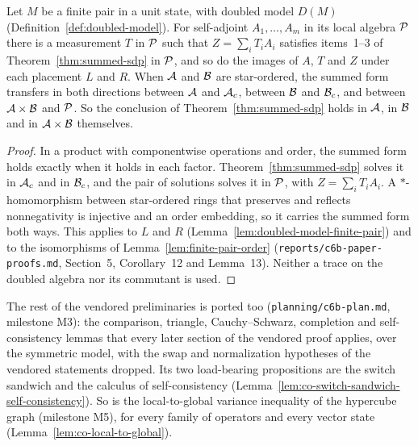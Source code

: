 \begin{corollary}
\label{cor:summed-sdp-doubled}
\leanok
Let $M$ be a finite pair in a unit state, with doubled model $D(M)$
(Definition~\ref{def:doubled-model}). For self-adjoint $A_1, \dots, A_m$ in its local algebra
$\cal{P}$ there is a measurement $T$ in $\cal{P}$ such that $Z = \sum_i T_i A_i$ satisfies
items~1--3 of Theorem~\ref{thm:summed-sdp} in $\cal{P}$, and so do the images of $A$, $T$ and $Z$
under each placement $L$ and $R$. When $\cal{A}$ and $\cal{B}$ are star-ordered, the summed form
transfers in both directions between $\cal{A}$ and $\cal{A}_c$, between $\cal{B}$ and $\cal{B}_c$,
and between $\cal{A} \times \cal{B}$ and $\cal{P}$. So the conclusion of
Theorem~\ref{thm:summed-sdp} holds in $\cal{A}$, in $\cal{B}$ and in $\cal{A} \times \cal{B}$
themselves.
\end{corollary}

\begin{proof}
\leanok
In a product with componentwise operations and order, the summed form holds exactly when it holds
in each factor. Theorem~\ref{thm:summed-sdp} solves it in $\cal{A}_c$ and in $\cal{B}_c$, and the
pair of solutions solves it in $\cal{P}$, with $Z = \sum_i T_i A_i$. A $*$-homomorphism between
star-ordered rings that preserves and reflects nonnegativity is injective and an order embedding,
so it carries the summed form both ways. This applies to $L$ and $R$
(Lemma~\ref{lem:doubled-model-finite-pair}) and to the isomorphisms of
Lemma~\ref{lem:finite-pair-order} (\texttt{reports/c6b-paper-proofs.md}, Section~5, Corollary~12
and Lemma~13). Neither a trace on the doubled algebra nor its commutant is used.
\end{proof}

The rest of the vendored preliminaries is ported too (\texttt{planning/c6b-plan.md}, milestone M3):
the comparison, triangle, Cauchy--Schwarz, completion and self-consistency lemmas that every later
section of the vendored proof applies, over the symmetric model, with the swap and normalization
hypotheses of the vendored statements dropped. Its two load-bearing propositions are the switch
sandwich and the calculus of self-consistency (Lemma~\ref{lem:co-switch-sandwich-self-consistency}).
So is the local-to-global variance inequality of the hypercube graph (milestone M5), for every
family of operators and every vector state (Lemma~\ref{lem:co-local-to-global}).

